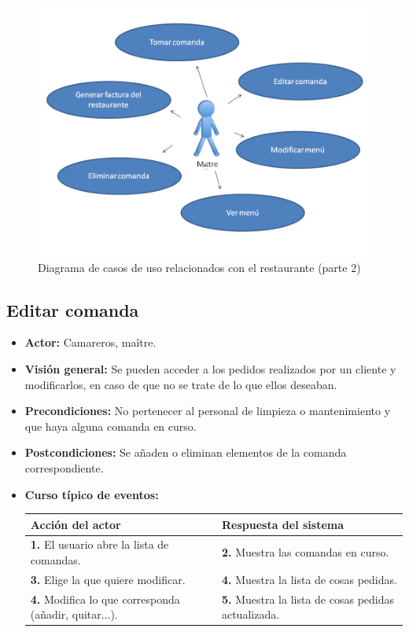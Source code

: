 \documentclass[spanish,a4paper,11pt, twoside]{report}	%
\begin{document}
	\begin{figure}[!h]
		\centering
		\includegraphics[scale=0.5]{Restaurante2.png}
		\caption{Diagrama de casos de uso relacionados con el restaurante (parte 2)}
	\end{figure}

		
	\subsection{Editar comanda}
			\begin{itemize}
			\item \textbf{Actor:} Camareros, maître.
			\item \textbf{Visión general:} Se pueden acceder a los pedidos realizados por un
				cliente y modificarlos, en caso de que no se trate de lo que ellos deseaban.
			\item \textbf{Precondiciones:} No pertenecer al personal de limpieza o
				mantenimiento y que haya alguna comanda en curso.
			\item \textbf{Postcondiciones:} Se añaden o eliminan elementos de la comanda
				correspondiente.
			\item \textbf{Curso típico de eventos:}  \\
				\begin{tabular}{|p{6cm}||p{6cm}|}
				\hline
				\textbf{Acción del actor} & \textbf{Respuesta del sistema} \\ \hline \hline
				\textbf{1.} El usuario abre la lista de comandas. & 
				\textbf{2.} Muestra las comandas en curso.\\ \hline 
				\textbf{3.} Elige la que quiere modificar. & 
				\textbf{4.} Muestra la lista de cosas pedidas. \\ \hline
				\textbf{4.} Modifica lo que corresponda (añadir, quitar...). & 
				\textbf{5.} Muestra la lista de cosas pedidas actualizada. \\ \hline
			\end{tabular}
		\end {itemize}
\end{document}
